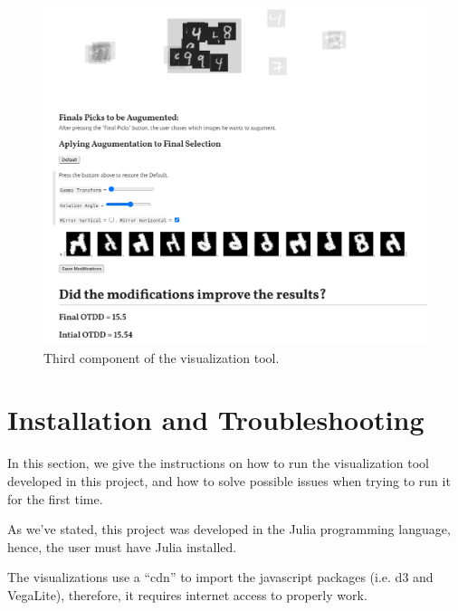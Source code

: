 \documentclass[10pt]{article}
\theoremstyle{definition}
\begin{document}
\begin{figure}[H]
  \centering
  \includegraphics[width=14cm]{Figures/thirdscreen.png}
  \caption{Third component of the visualization tool.}
  \label{fig:thirdscreen}
\end{figure}

\section{Installation and Troubleshooting}

In this section, we give the instructions on how to run the visualization tool
developed in this project, and how to solve possible issues when trying to
run it for the first time.

As we've stated, this project was developed in the Julia programming language,
hence, the user must have Julia installed.

The visualizations use a ``cdn'' to import the javascript packages (i.e. d3 and VegaLite),
therefore, it requires internet access to properly work.


  
  
\end{document}
